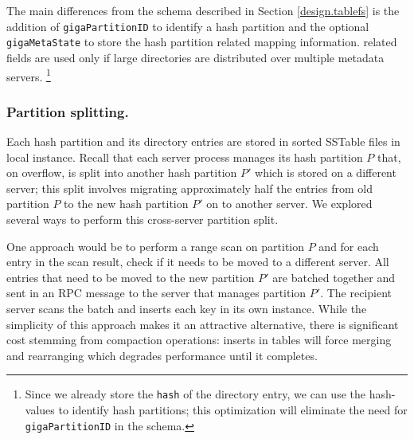 The main differences from the \ldb{} schema described in Section
\ref{design.tablefs} is the addition of \texttt{gigaPartitionID} to identify a
\giga{} hash partition and the optional \texttt{gigaMetaState} to store the
hash partition related mapping information. \giga{} related fields are used
only if large directories are distributed over multiple metadata servers.
\footnote{
Since we already store the \texttt{hash} of the directory entry, we can use the
hash-values to identify hash partitions; this optimization will eliminate the
need for \texttt{gigaPartitionID} in the schema.} 

\subsubsection*{Partition splitting.}

Each \giga{} hash partition and its directory entries are stored in sorted
SSTable files in local \ldb{} instance. 
Recall that each \giga{} server process manages its hash partition $P$ that, on 
overflow, is split into another hash partition $P'$ which is stored on a 
different server; this split involves migrating approximately half the entries 
from old partition $P$ to the new hash partition $P'$ on to another server. 
We explored several ways to perform this cross-server partition split.

One approach would be to perform a range scan on partition $P$ and for each
entry in the scan result, check if it needs to be moved to a different server.
All entries that need to be moved to the new partition $P'$ are batched
together and sent in an RPC message to the server that manages partition $P'$.
The recipient server scans the batch and inserts each key in its own \ldb{}
instance. While the simplicity of this approach makes it an attractive
alternative, there is significant cost stemming from \ldb{} compaction
operations: inserts in \ldb{} tables will force merging and rearranging which
degrades performance until it completes.

